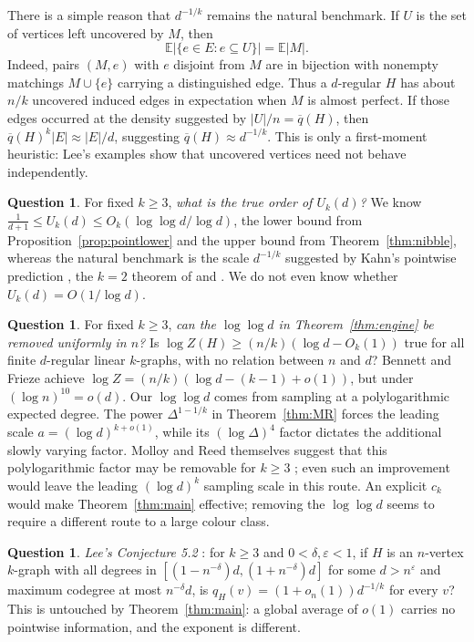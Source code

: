 \documentclass[11pt,a4paper]{amsart}
\theoremstyle{plain}
\theoremstyle{definition}
\newtheorem{question}[theorem]{Question}
\theoremstyle{remark}
\newcommand{\EE}{E}
\newcommand{\EX}{\mathbb{E}}
\newcommand{\qbar}{\overline{q}}
\begin{document}
There is a simple reason that $d^{-1/k}$ remains the natural benchmark. If $U$ is the
set of vertices left uncovered by $M$, then
\[
  \EX\bigl|\{e\in\EE:e\subseteq U\}\bigr|=\EX|M|.
\]
Indeed, pairs $(M,e)$ with $e$ disjoint from $M$ are in bijection with nonempty matchings
$M\cup\{e\}$ carrying a distinguished edge. Thus a $d$-regular $H$ has about $n/k$
uncovered induced edges in expectation when $M$ is almost perfect. If those edges occurred
at the density suggested by $|U|/n=\qbar(H)$, then
$\qbar(H)^k|\EE|\approx |\EE|/d$, suggesting $\qbar(H)\approx d^{-1/k}$. This is only a
first-moment heuristic: Lee's examples show that uncovered vertices need not behave
independently.

\begin{question}
For fixed $k\ge3$, \emph{what is the true order of $U_k(d)$?} We know
$\frac1{d+1}\le U_k(d)\le O_k(\log\log d/\log d)$, the lower bound from
Proposition~\ref{prop:pointlower} and the upper bound from Theorem~\ref{thm:nibble}, whereas the
natural benchmark is the scale $d^{-1/k}$ suggested by Kahn's pointwise prediction
\cite{Kahn95,Kahn97}, the $k=2$ theorem of \cite{KahnKim98} and
\cite[Conjecture 5.2]{Lee}. We do not even know
whether $U_k(d)=O(1/\log d)$.
\end{question}

\begin{question}
For fixed $k\ge3$, \emph{can the $\log\log d$ in Theorem~\ref{thm:engine} be removed
uniformly in $n$?} Is
$\log Z(H)\ge(n/k)(\log d-O_k(1))$ true for all finite $d$-regular linear $k$-graphs, with
no relation between $n$ and $d$? Bennett and Frieze \cite[Theorem 4(b)]{BennettFrieze}
achieve $\log Z=(n/k)(\log d-(k-1)+o(1))$, but under $(\log n)^{10}=o(d)$. Our $\log\log d$
comes from sampling at a polylogarithmic expected degree. The power
$\Delta^{1-1/k}$ in Theorem~\ref{thm:MR} forces the leading scale
$a=(\log d)^{k+o(1)}$, while its $(\log\Delta)^4$ factor dictates the additional
slowly varying factor. Molloy and Reed themselves suggest that this polylogarithmic factor
may be removable for $k\ge3$ \cite{MolloyReed}; even such an improvement would leave the
leading $(\log d)^k$ sampling scale in this route. An explicit $c_k$ would make
Theorem~\ref{thm:main} effective; removing the $\log\log d$ seems to require a different
route to a large colour class.
\end{question}

\begin{question}
\emph{Lee's Conjecture 5.2} \cite[Conjecture 5.2]{Lee}: for $k\ge3$ and
$0<\delta,\varepsilon<1$, if $H$ is an $n$-vertex $k$-graph with all degrees in
$[(1-n^{-\delta})d,(1+n^{-\delta})d]$ for some $d>n^{\varepsilon}$ and maximum codegree at
most $n^{-\delta}d$, is $q_H(v)=(1+o_n(1))d^{-1/k}$ for every $v$? This is untouched by
Theorem~\ref{thm:main}: a global average of $o(1)$ carries no pointwise information, and
the exponent is different.
\end{question}
\end{document}

